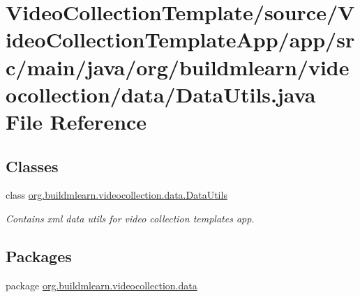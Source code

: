\hypertarget{VideoCollectionTemplate_2source_2VideoCollectionTemplateApp_2app_2src_2main_2java_2org_2buildmle013b34ea684e2708e64b4b961571aa67}{}\section{Video\+Collection\+Template/source/\+Video\+Collection\+Template\+App/app/src/main/java/org/buildmlearn/videocollection/data/\+Data\+Utils.java File Reference}
\label{VideoCollectionTemplate_2source_2VideoCollectionTemplateApp_2app_2src_2main_2java_2org_2buildmle013b34ea684e2708e64b4b961571aa67}
\subsection*{Classes}
\begin{DoxyCompactItemize}
\item 
class \hyperlink{classorg_1_1buildmlearn_1_1videocollection_1_1data_1_1DataUtils}{org.\+buildmlearn.\+videocollection.\+data.\+Data\+Utils}
\begin{DoxyCompactList}\small\item\em Contains xml data utils for video collection template\textquotesingle{}s app. \end{DoxyCompactList}\end{DoxyCompactItemize}
\subsection*{Packages}
\begin{DoxyCompactItemize}
\item 
package \hyperlink{namespaceorg_1_1buildmlearn_1_1videocollection_1_1data}{org.\+buildmlearn.\+videocollection.\+data}
\end{DoxyCompactItemize}
